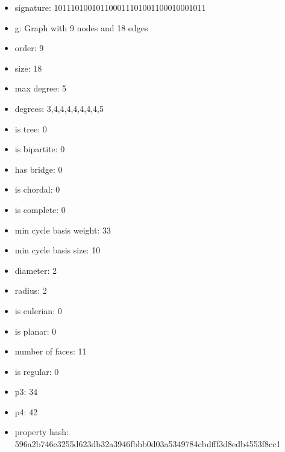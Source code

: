 \newpage
\begin{figure}
\end{figure}
\begin{itemize}
\item signature: 101110100101100011101001100010001011
\item g: Graph with 9 nodes and 18 edges
\item order: 9
\item size: 18
\item max degree: 5
\item degrees: 3,4,4,4,4,4,4,4,5
\item is tree: 0
\item is bipartite: 0
\item has bridge: 0
\item is chordal: 0
\item is complete: 0
\item min cycle basis weight: 33
\item min cycle basis size: 10
\item diameter: 2
\item radius: 2
\item is eulerian: 0
\item is planar: 0
\item number of faces: 11
\item is regular: 0
\item p3: 34
\item p4: 42
\item property hash: 596a2b746e3255d623db32a3946fbbb0d03a5349784cbdfff3d8edb4553f8cc1
\end{itemize}

